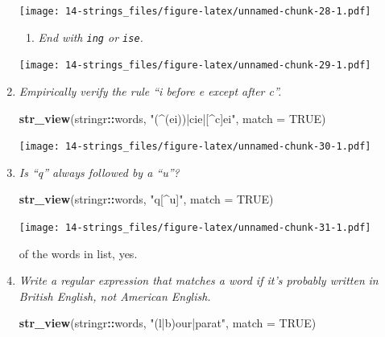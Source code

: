 \documentclass[]{book}
\newenvironment{Shaded}{\begin{snugshade}}{\end{snugshade}}
\newcommand{\DataTypeTok}[1]{\textcolor[rgb]{0.13,0.29,0.53}{#1}}
\newcommand{\KeywordTok}[1]{\textcolor[rgb]{0.13,0.29,0.53}{\textbf{#1}}}
\newcommand{\NormalTok}[1]{#1}
\newcommand{\OperatorTok}[1]{\textcolor[rgb]{0.81,0.36,0.00}{\textbf{#1}}}
\newcommand{\OtherTok}[1]{\textcolor[rgb]{0.56,0.35,0.01}{#1}}
\newcommand{\StringTok}[1]{\textcolor[rgb]{0.31,0.60,0.02}{#1}}
\providecommand{\tightlist}{%
  \setlength{\itemsep}{0pt}\setlength{\parskip}{0pt}}
\theoremstyle{definition}
\theoremstyle{definition}
\theoremstyle{definition}
\theoremstyle{remark}
\begin{document}
\begin{enumerate}
  \texttt{[image: 14-strings\_files/figure-latex/unnamed-chunk-28-1.pdf]}

  \begin{enumerate}
  \def\labelenumii{\arabic{enumii}.}
  \setcounter{enumii}{3}
  \tightlist
  \item
    \emph{End with \texttt{ing} or \texttt{ise}.}
  \end{enumerate}

\begin{Shaded}
\end{Shaded}

  \texttt{[image: 14-strings\_files/figure-latex/unnamed-chunk-29-1.pdf]}
\item
  \emph{Empirically verify the rule ``i before e except after c''.}

\begin{Shaded}
\begin{Highlighting}[]
\KeywordTok{str_view}\NormalTok{(stringr}\OperatorTok{::}\NormalTok{words, }\StringTok{"(^(ei))|cie|[^c]ei"}\NormalTok{, }\DataTypeTok{match =} \OtherTok{TRUE}\NormalTok{)}
\end{Highlighting}
\end{Shaded}

  \texttt{[image: 14-strings\_files/figure-latex/unnamed-chunk-30-1.pdf]}
\item
  \emph{Is ``q'' always followed by a ``u''?}

\begin{Shaded}
\begin{Highlighting}[]
\KeywordTok{str_view}\NormalTok{(stringr}\OperatorTok{::}\NormalTok{words, }\StringTok{"q[^u]"}\NormalTok{, }\DataTypeTok{match =} \OtherTok{TRUE}\NormalTok{)}
\end{Highlighting}
\end{Shaded}

  \texttt{[image: 14-strings\_files/figure-latex/unnamed-chunk-31-1.pdf]}

  of the words in list, yes.
\item
  \emph{Write a regular expression that matches a word if it's probably
  written} \emph{in British English, not American English.}

\begin{Shaded}
\begin{Highlighting}[]
\KeywordTok{str_view}\NormalTok{(stringr}\OperatorTok{::}\NormalTok{words, }\StringTok{"(l|b)our|parat"}\NormalTok{, }\DataTypeTok{match =} \OtherTok{TRUE}\NormalTok{)}
\end{Highlighting}
\end{Shaded}


\end{enumerate}
\end{document}
